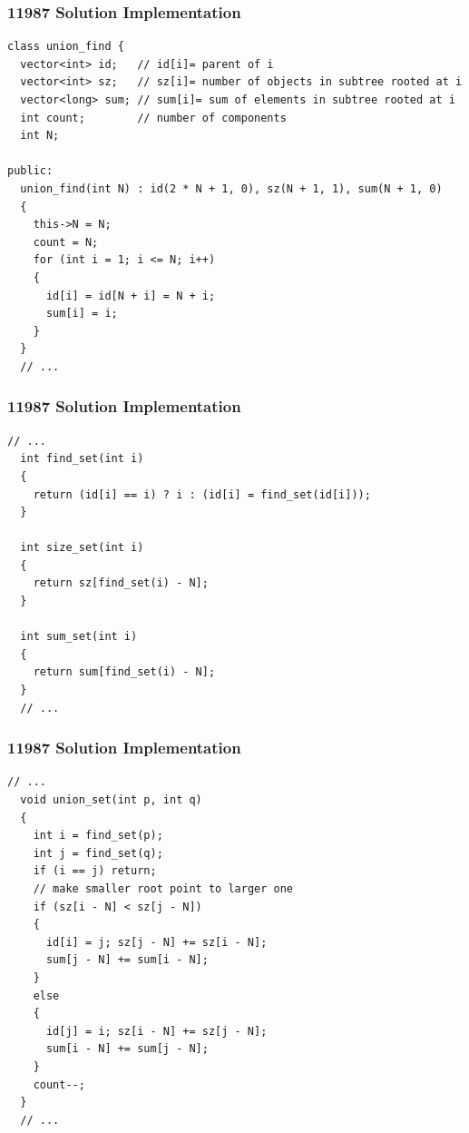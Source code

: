 \documentclass{beamer}
\begin{document}
\begin{frame}[containsverbatim]
\frametitle{11987 Solution Implementation}

\scriptsize

\begin{lstlisting}[mathescape]
class union_find {
  vector<int> id;   // id[i]= parent of i
  vector<int> sz;   // sz[i]= number of objects in subtree rooted at i
  vector<long> sum; // sum[i]= sum of elements in subtree rooted at i
  int count;        // number of components
  int N;

public:
  union_find(int N) : id(2 * N + 1, 0), sz(N + 1, 1), sum(N + 1, 0)
  {
    this->N = N;
    count = N;
    for (int i = 1; i <= N; i++)
    {
      id[i] = id[N + i] = N + i;
      sum[i] = i;
    }
  }
  // ...
\end{lstlisting}

\end{frame}

\begin{frame}[containsverbatim]
\frametitle{11987 Solution Implementation}

\scriptsize

\begin{lstlisting}[mathescape]
  // ...
  int find_set(int i)
  {
    return (id[i] == i) ? i : (id[i] = find_set(id[i]));
  }

  int size_set(int i)
  {
    return sz[find_set(i) - N];
  }

  int sum_set(int i)
  {
    return sum[find_set(i) - N];
  }
  // ...
\end{lstlisting}

\end{frame}

\begin{frame}[containsverbatim]
\frametitle{11987 Solution Implementation}

\scriptsize

\begin{lstlisting}[mathescape]
  // ...
  void union_set(int p, int q)
  {
    int i = find_set(p);
    int j = find_set(q);
    if (i == j) return;
    // make smaller root point to larger one
    if (sz[i - N] < sz[j - N])
    {
      id[i] = j; sz[j - N] += sz[i - N];
      sum[j - N] += sum[i - N];
    }
    else
    {
      id[j] = i; sz[i - N] += sz[j - N];
      sum[i - N] += sum[j - N];
    }
    count--;
  }
  // ...
\end{lstlisting}

\end{frame}
\end{document}
